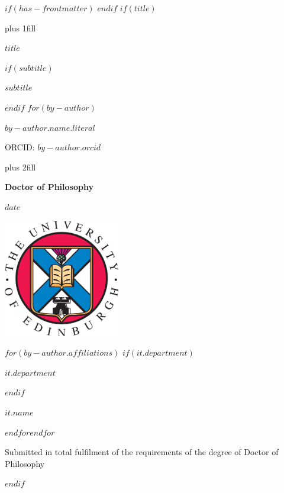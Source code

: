 $if(has-frontmatter)$
\frontmatter
$endif$
$if(title)$
\cleardoublepage
\thispagestyle{empty}
{\centering
\hbox{}\vskip 0cm plus 1fill
{\Huge\bfseries $title$ \par}
$if(subtitle)$
\vspace{3ex}
{\large\bfseries $subtitle$ \par}
$endif$
\vspace{10ex}
$for(by-author)$
{\Large\bfseries $by-author.name.literal$ \par}
{\large ORCID: $by-author.orcid$ \par}
\vskip 0cm plus 2fill
{\bfseries\large Doctor of Philosophy \par}
\vspace{3ex}
{\bfseries\large $date$ \par}
\vspace{5ex}

\centering%
\includegraphics[width=2in]{EdUniCrest.eps}\par%
\vspace{5ex}

$for(by-author.affiliations)$%
$if(it.department)$%
{\bfseries\large $it.department$ \par}
\vspace{3ex}
$endif$%
{\bfseries\large $it.name$ \par}
$endfor$$endfor$%
\vspace{10ex}
{\small Submitted in total fulfilment of the requirements
of the degree of Doctor of Philosophy \par}
}
$endif$